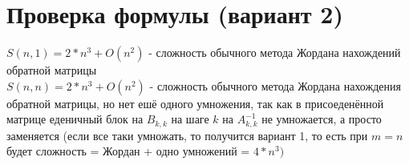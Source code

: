 \documentclass[a4paper,12pt]{article}
\begin{document}
\section{Проверка формулы (вариант 2)}
$S(n, 1) = 2*n^{3} + O(n^{2})$ - сложность обычного метода Жордана нахождений обратной матрицы\\
$S(n, n) = 2*n^{3} + O(n^{2})$ - сложность обычного метода Жордана нахождения обратной матрицы,
но нет ешё одного умножения, так как в присоеденённой матрице еденичный блок на 
$B_{k, k}$ на шаге $k$ на $A_{k,k}^{-1}$ не умножается, а просто заменяется
(если все таки умножать, то получится вариант 1, то есть при $m=n$ будет
сложность = Жордан + одно умножений = $4*n^{3})$
\end{document}
